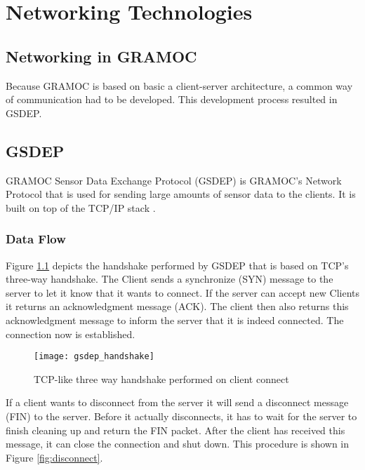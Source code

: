 \chapter{Networking Technologies}
\label{ch:networkingtechnologies}

\author{Nico Kratky}
%
\section{Networking in GRAMOC}

Because GRAMOC is based on basic a client-server architecture, a common way of communication had to be developed. This development process resulted in GSDEP.

\section{GSDEP}

GRAMOC Sensor Data Exchange Protocol (GSDEP) is GRAMOC's Network Protocol that is used for sending large amounts of sensor data to the clients. It is built on top of the TCP/IP stack \cite{rfc793, rfc791}.

\subsection{Data Flow}
\label{sec:networking_data-flow}

Figure \ref{fig:handshake} depicts the handshake performed by GSDEP that is based on TCP's three-way handshake. The Client sends a synchronize (SYN) message to the server to let it know that it wants to connect. If the server can accept new Clients it returns an acknowledgment message (ACK). The client then also returns this acknowledgment message to inform the server that it is indeed connected. The connection now is established.

\begin{figure}[H]
    \centering
    \texttt{[image: gsdep\_handshake]}
    \caption{TCP-like three way handshake performed on client connect}
    \label{fig:handshake}
\end{figure}

If a client wants to disconnect from the server it will send a disconnect message (FIN) to the server. Before it actually disconnects, it has to wait for the server to finish cleaning up and return the FIN packet. After the client has received this message, it can close the connection and shut down. This procedure is shown in Figure \ref{fig:disconnect}.

